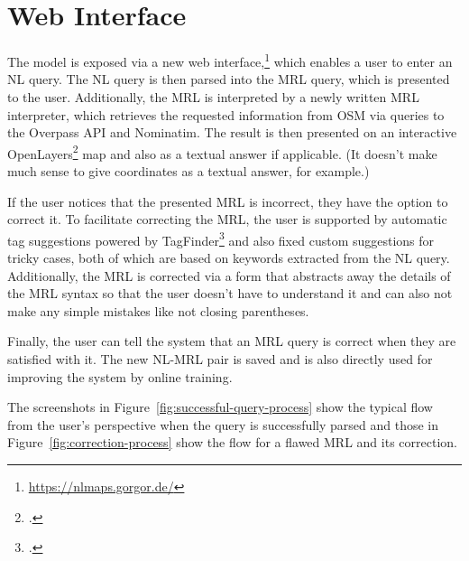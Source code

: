 \chapter{Web Interface}
\label{ch:web-interface}

The model is exposed via a new web
interface,\footnote{\url{https://nlmaps.gorgor.de/}} which enables a user to
enter an NL query. The NL query is then parsed into the MRL query, which is
presented to the user. Additionally, the MRL is interpreted by a newly written
MRL interpreter, which retrieves the requested information from OSM via queries
to the Overpass API and Nominatim. The result is then presented on an
interactive OpenLayers\footcite{openlayers} map and also as a textual answer if
applicable. (It doesn’t make much sense to give coordinates as a textual answer,
for example.)

If the user notices that the presented MRL is incorrect, they have the option to
correct it. To facilitate correcting the MRL, the user is supported by automatic
tag suggestions powered by TagFinder\footcite{tagfinder}
\parencite{gwerder-2014} and also fixed custom suggestions for tricky cases,
both of which are based on keywords extracted from the NL query. Additionally,
the MRL is corrected via a form that abstracts away the details of the MRL
syntax so that the user doesn’t have to understand it and can also not make any
simple mistakes like not closing parentheses.

Finally, the user can tell the system that an MRL query is correct when they are
satisfied with it. The new NL-MRL pair is saved and is also directly used for
improving the system by online training.

The screenshots in Figure~\ref{fig:successful-query-process} show the typical
flow from the user’s perspective when the query is successfully parsed and those
in Figure~\ref{fig:correction-process} show the flow for a flawed MRL and its
correction.

